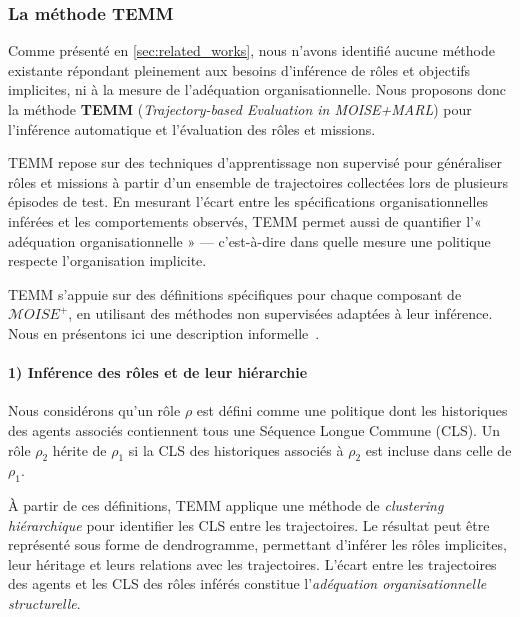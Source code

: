 \documentclass[pdflatex,sn-mathphys-num]{sn-jnl}%
\theoremstyle{thmstyleone}%
\theoremstyle{thmstyletwo}%
\theoremstyle{thmstylethree}%
\begin{document}
\subsubsection{La méthode TEMM}
\label{sec:TEMM_algorithm}

Comme présenté en \autoref{sec:related_works}, nous n'avons identifié aucune méthode existante répondant pleinement aux besoins d'inférence de rôles et objectifs implicites, ni à la mesure de l'adéquation organisationnelle. Nous proposons donc la méthode \textbf{TEMM} (\textit{Trajectory-based Evaluation in MOISE+MARL}) pour l'inférence automatique et l'évaluation des rôles et missions.

TEMM repose sur des techniques d'apprentissage non supervisé pour généraliser rôles et missions à partir d'un ensemble de trajectoires collectées lors de plusieurs épisodes de test. En mesurant l'écart entre les spécifications organisationnelles inférées et les comportements observés, TEMM permet aussi de quantifier l'« adéquation organisationnelle » — c'est-à-dire dans quelle mesure une politique respecte l'organisation implicite.

TEMM s'appuie sur des définitions spécifiques pour chaque composant de $\mathcal{M}OISE^+$, en utilisant des méthodes non supervisées adaptées à leur inférence. Nous en présentons ici une description informelle~\hyperref[fn:github]{\footnotemark[1]}.
%

\paragraph{1) Inférence des rôles et de leur hiérarchie}

Nous considérons qu'un rôle $\rho$ est défini comme une politique dont les historiques des agents associés contiennent tous une Séquence Longue Commune (CLS). Un rôle $\rho_2$ hérite de $\rho_1$ si la CLS des historiques associés à $\rho_2$ est incluse dans celle de $\rho_1$.

À partir de ces définitions, TEMM applique une méthode de \textit{clustering hiérarchique} pour identifier les CLS entre les trajectoires. Le résultat peut être représenté sous forme de dendrogramme, permettant d'inférer les rôles implicites, leur héritage et leurs relations avec les trajectoires.  
L'écart entre les trajectoires des agents et les CLS des rôles inférés constitue l'\textit{adéquation organisationnelle structurelle}.
\end{document}
